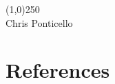 \documentclass[titlesmallcaps, examinerscopy, copyrightpage]{uqthesis}
\begin{document}
\noindent \line(1,0){250} \\

\noindent Chris Ponticello





\tableofcontents
\listoffigures
\listoftables

\mainmatter




\cite{dummy:2012}


\cleardoublepage

\chapter*{References}

\begingroup
\renewcommand{\chapter}[2]{}

\endgroup


\appendix


\end{document}
